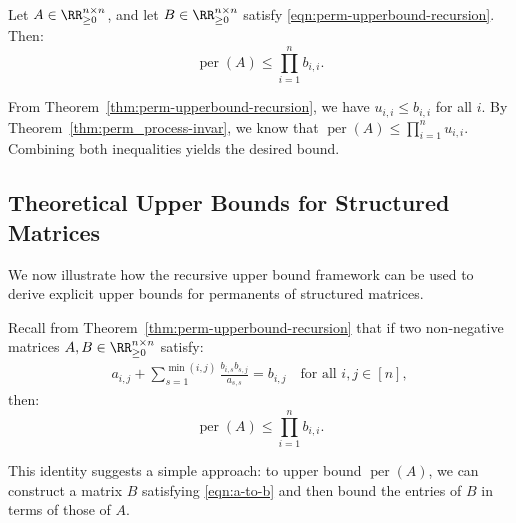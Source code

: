 \documentclass[11pt]{article}
\makeatletter
\theoremstyle{definition}
\newenvironment{proof}[1][\protect\proofname]{\par
	\normalfont\topsep6\p@\@plus6\p@\relax
	\trivlist
	\itemindent\parindent        %
	\item[\hskip\labelsep\scshape #1]\ignorespaces
}{%
	\endtrivlist\@endpefalse
}
\providecommand{\proofname}{Proof}
\DeclareMathOperator{\per}{per}
\makeatother
\begin{document}
\begin{corollary}
	\label{cor: permanent-diag-prod-ub}
	Let \( A \in \RR^{n \times n}_{\geq 0} \), and let \( B \in \RR^{n \times n}_{\geq 0} \) satisfy \eqref{eqn:perm-upperbound-recursion}. Then:
	\begin{equation*}
	    \per(A) \le \prod_{i=1}^n b_{i,i}.
	\end{equation*}
\end{corollary}

\begin{proof}
	From Theorem~\ref{thm:perm-upperbound-recursion}, we have \( u_{i,i} \le b_{i,i} \) for all \( i \). By Theorem~\ref{thm:perm_process-invar}, we know that \( \per(A) \le \prod_{i=1}^n u_{i,i} \). Combining both inequalities yields the desired bound.
\end{proof}

\subsection{Theoretical Upper Bounds for Structured Matrices}
\label{sec:theoretical-ub}
We now illustrate how the recursive upper bound framework can be used to derive explicit upper bounds for permanents of structured matrices. 

Recall from Theorem~\ref{thm:perm-upperbound-recursion} that if two non-negative matrices \( A, B \in \RR^{n \times n}_{\geq 0} \) satisfy:
\begin{align}
	\label{eqn:a-to-b}
	a_{i,j} + \sum_{ s = 1}^{\min(i,j)} \frac{b_{i,s} b_{s,j}}{a_{s,s}} = b_{i,j} \quad \text{for all } i,j \in [n],
\end{align}
then:
\begin{equation*}
    \per(A) \le \prod_{i=1}^n b_{i,i}.
\end{equation*}

This identity suggests a simple approach: to upper bound \( \per(A) \), we can construct a matrix \( B \) satisfying \eqref{eqn:a-to-b} and then bound the entries of \( B \) in terms of those of \( A \).
\end{document}
